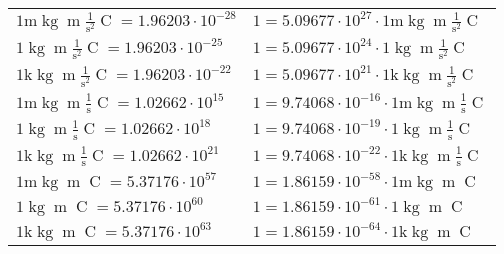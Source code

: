 \begin{center}
\begin{longtable}{l l}
{\color{gray}$1 \bm{\mathrm{ m}}\operatorname{kg}{\operatorname{m}}\frac1{\operatorname{s}^2}{\operatorname{C}}{} = 1.96203\cdot10^{-28} $}   & {\color{gray}$ 1 = 5.09677\cdot10^{27} \cdot 1 \bm{\mathrm{ m}}\operatorname{kg}{\operatorname{m}}\frac1{\operatorname{s}^2}{\operatorname{C}}{}$}  \\
{\color{black}$1 \bm{\mathrm{ }}\operatorname{kg}{\operatorname{m}}\frac1{\operatorname{s}^2}{\operatorname{C}}{} = 1.96203\cdot10^{-25} $}   & {\color{black}$ 1 = 5.09677\cdot10^{24} \cdot 1 \bm{\mathrm{ }}\operatorname{kg}{\operatorname{m}}\frac1{\operatorname{s}^2}{\operatorname{C}}{}$}  \\
{\color{gray}$1 \bm{\mathrm{ k}}\operatorname{kg}{\operatorname{m}}\frac1{\operatorname{s}^2}{\operatorname{C}}{} = 1.96203\cdot10^{-22} $}   & {\color{gray}$ 1 = 5.09677\cdot10^{21} \cdot 1 \bm{\mathrm{ k}}\operatorname{kg}{\operatorname{m}}\frac1{\operatorname{s}^2}{\operatorname{C}}{}$}  \\
{\color{gray}$1 \bm{\mathrm{ m}}\operatorname{kg}{\operatorname{m}}\frac1{\operatorname{s}}{\operatorname{C}}{} = 1.02662\cdot10^{15} $}   & {\color{gray}$ 1 = 9.74068\cdot10^{-16} \cdot 1 \bm{\mathrm{ m}}\operatorname{kg}{\operatorname{m}}\frac1{\operatorname{s}}{\operatorname{C}}{}$}  \\
{\color{black}$1 \bm{\mathrm{ }}\operatorname{kg}{\operatorname{m}}\frac1{\operatorname{s}}{\operatorname{C}}{} = 1.02662\cdot10^{18} $}   & {\color{black}$ 1 = 9.74068\cdot10^{-19} \cdot 1 \bm{\mathrm{ }}\operatorname{kg}{\operatorname{m}}\frac1{\operatorname{s}}{\operatorname{C}}{}$}  \\
{\color{gray}$1 \bm{\mathrm{ k}}\operatorname{kg}{\operatorname{m}}\frac1{\operatorname{s}}{\operatorname{C}}{} = 1.02662\cdot10^{21} $}   & {\color{gray}$ 1 = 9.74068\cdot10^{-22} \cdot 1 \bm{\mathrm{ k}}\operatorname{kg}{\operatorname{m}}\frac1{\operatorname{s}}{\operatorname{C}}{}$}  \\
{\color{gray}$1 \bm{\mathrm{ m}}\operatorname{kg}{\operatorname{m}}{}{\operatorname{C}}{} = 5.37176\cdot10^{57} $}   & {\color{gray}$ 1 = 1.86159\cdot10^{-58} \cdot 1 \bm{\mathrm{ m}}\operatorname{kg}{\operatorname{m}}{}{\operatorname{C}}{}$}  \\
{\color{black}$1 \bm{\mathrm{ }}\operatorname{kg}{\operatorname{m}}{}{\operatorname{C}}{} = 5.37176\cdot10^{60} $}   & {\color{black}$ 1 = 1.86159\cdot10^{-61} \cdot 1 \bm{\mathrm{ }}\operatorname{kg}{\operatorname{m}}{}{\operatorname{C}}{}$}  \\
{\color{gray}$1 \bm{\mathrm{ k}}\operatorname{kg}{\operatorname{m}}{}{\operatorname{C}}{} = 5.37176\cdot10^{63} $}   & {\color{gray}$ 1 = 1.86159\cdot10^{-64} \cdot 1 \bm{\mathrm{ k}}\operatorname{kg}{\operatorname{m}}{}{\operatorname{C}}{}$}  \\

\end{longtable}
\end{center}

